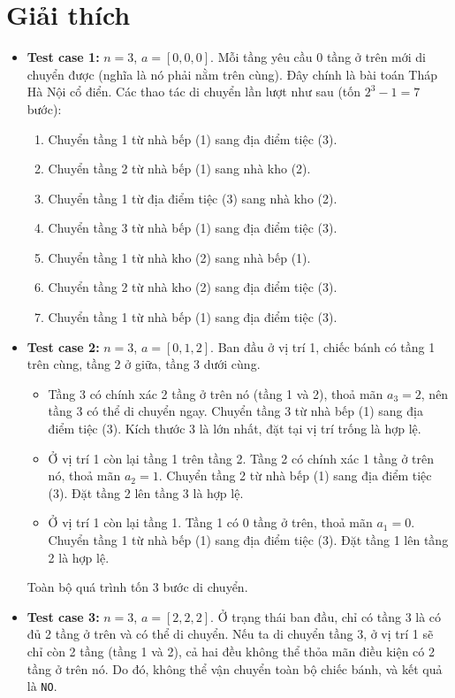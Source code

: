 \documentclass[12pt,a4paper]{article}
\begin{document}
\section*{Giải thích}
\begin{itemize}
    \item \textbf{Test case 1:} $n = 3$, $a = [0, 0, 0]$. Mỗi tầng yêu cầu $0$ tầng ở trên mới di chuyển được (nghĩa là nó phải nằm trên cùng). Đây chính là bài toán Tháp Hà Nội cổ điển. Các thao tác di chuyển lần lượt như sau (tốn $2^3 - 1 = 7$ bước):
    \begin{enumerate}
        \item Chuyển tầng 1 từ nhà bếp (1) sang địa điểm tiệc (3).
        \item Chuyển tầng 2 từ nhà bếp (1) sang nhà kho (2).
        \item Chuyển tầng 1 từ địa điểm tiệc (3) sang nhà kho (2).
        \item Chuyển tầng 3 từ nhà bếp (1) sang địa điểm tiệc (3).
        \item Chuyển tầng 1 từ nhà kho (2) sang nhà bếp (1).
        \item Chuyển tầng 2 từ nhà kho (2) sang địa điểm tiệc (3).
        \item Chuyển tầng 1 từ nhà bếp (1) sang địa điểm tiệc (3).
    \end{enumerate}

    \item \textbf{Test case 2:} $n = 3$, $a = [0, 1, 2]$. Ban đầu ở vị trí 1, chiếc bánh có tầng 1 trên cùng, tầng 2 ở giữa, tầng 3 dưới cùng.
    \begin{itemize}
        \item Tầng 3 có chính xác 2 tầng ở trên nó (tầng 1 và 2), thoả mãn $a_3=2$, nên tầng 3 có thể di chuyển ngay. Chuyển tầng 3 từ nhà bếp (1) sang địa điểm tiệc (3). Kích thước 3 là lớn nhất, đặt tại vị trí trống là hợp lệ.
        \item Ở vị trí 1 còn lại tầng 1 trên tầng 2. Tầng 2 có chính xác 1 tầng ở trên nó, thoả mãn $a_2=1$. Chuyển tầng 2 từ nhà bếp (1) sang địa điểm tiệc (3). Đặt tầng 2 lên tầng 3 là hợp lệ.
        \item Ở vị trí 1 còn lại tầng 1. Tầng 1 có 0 tầng ở trên, thoả mãn $a_1=0$. Chuyển tầng 1 từ nhà bếp (1) sang địa điểm tiệc (3). Đặt tầng 1 lên tầng 2 là hợp lệ.
    \end{itemize}
    Toàn bộ quá trình tốn 3 bước di chuyển.

    \item \textbf{Test case 3:} $n = 3$, $a = [2, 2, 2]$. Ở trạng thái ban đầu, chỉ có tầng 3 là có đủ 2 tầng ở trên và có thể di chuyển. Nếu ta di chuyển tầng 3, ở vị trí 1 sẽ chỉ còn 2 tầng (tầng 1 và 2), cả hai đều không thể thỏa mãn điều kiện có 2 tầng ở trên nó. Do đó, không thể vận chuyển toàn bộ chiếc bánh, và kết quả là \texttt{NO}.
\end{itemize}
\end{document}
